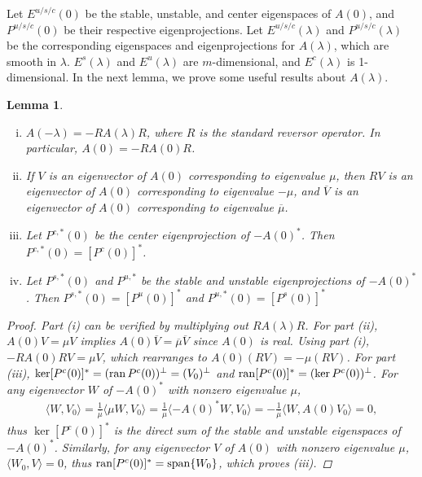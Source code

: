 \documentclass[10pt,reqno]{amsart}
\theoremstyle{plain}
\newtheorem{lemma}[theorem]{Lemma}
\theoremstyle{definition}
\theoremstyle{remark}
\numberwithin{theorem}{section}
\numberwithin{equation}{section}
\begin{document}
Let $E^{u/s/c}(0)$ be the stable, unstable, and center eigenspaces of $A(0)$, and $P^{u/s/c}(0)$ be their respective eigenprojections. Let $E^{u/s/c}(\lambda)$ and $P^{u/s/c}(\lambda)$ be the corresponding eigenspaces and eigenprojections for $A(\lambda)$, which are smooth in $\lambda$. $E^s(\lambda)$ and $E^u(\lambda)$ are $m$-dimensional, and $E^c(\lambda)$ is 1-dimensional. In the next lemma, we prove some useful results about $A(\lambda)$.

\begin{lemma}\label{lemma:Afacts}\leavevmode
\begin{enumerate}[(i)]
	\item $A(-\lambda) = -R A(\lambda)R$, where $R$ is the standard reversor operator. In particular, $A(0) = -R A(0)R$.
	\item If $V$ is an eigenvector of $A(0)$ corresponding to eigenvalue $\mu$, then $RV$ is an eigenvector of $A(0)$ corresponding to eigenvalue $-\mu$, and $\overline{V}$ is an eigenvector of $A(0)$ corresponding to eigenvalue $\overline{\mu}$. 
	\item Let $P^{c,*}(0)$ be the center eigenprojection of $-A(0)^*$. Then $P^{c,*}(0) = [P^c(0)]^*$. 
	\item Let $P^{s,*}(0)$ and $P^{u,*}$ be the stable and unstable eigenprojections of $-A(0)^*$. Then $P^{s,*}(0) = [P^u(0)]^*$ and $P^{u,*}(0) = [P^s(0)]^*$
\end{enumerate}	
\begin{proof}
Part (i) can be verified by multiplying out $R A(\lambda)R$. For part (ii), $A(0)V = \mu V$ implies $A(0)\overline{V} = \overline{\mu}\overline{V}$ since $A(0)$ is real. Using part (i), $-R A(0) R V = \mu V$, which rearranges to $A(0) (RV) = -\mu(RV)$. For part (iii), $\mathop\mathrm{ker}\nolimits [P^c(0)]^* = (\operatorname{ran} P^c(0))^\perp = (V_0)^\perp$  and $\operatorname{ran} [P^c(0)]^* = (\mathop\mathrm{ker}\nolimits P^c(0))^\perp$. For any eigenvector $W$ of $-A(0)^*$ with nonzero eigenvalue $\mu$,
\begin{align*}
\langle W, V_0 \rangle = \frac{1}{\overline{\mu}} \langle \mu W, V_0 \rangle
= \frac{1}{\overline{\mu}}\langle -A(0)^* W, V_0 \rangle = -\frac{1}{\overline{\mu}}\langle W, A(0) V_0 \rangle = 0,
\end{align*}
thus $\ker [P^c(0)]^*$ is the direct sum of the stable and unstable eigenspaces of $-A(0)^*$. Similarly, for any eigenvector $V$ of $A(0)$ with nonzero eigenvalue $\mu$, $\langle W_0, V \rangle = 0$, thus $\operatorname{ran} [P^c(0)]^* = \operatorname{span}\{W_0\}$, which proves (iii).


\end{proof}
\end{lemma}
\end{document}
